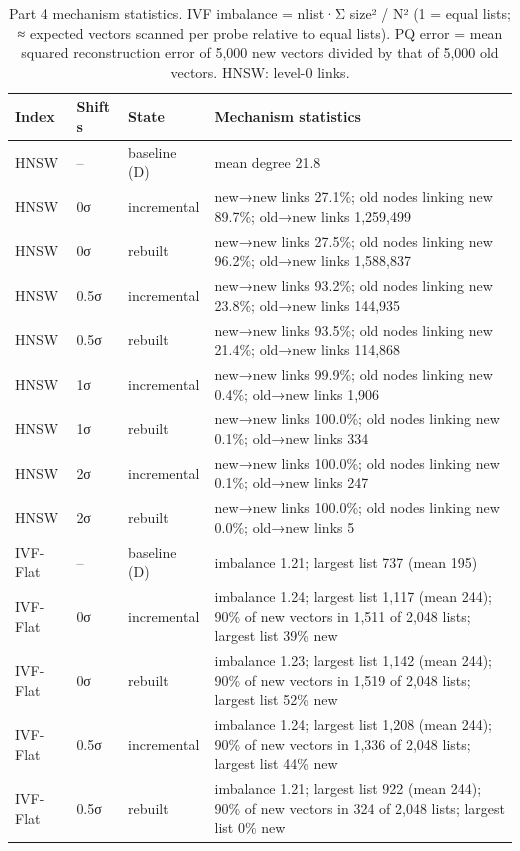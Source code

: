 \begin{table}[t]
\centering
\small
\caption{Part 4 mechanism statistics. IVF imbalance = nlist·Σ size² / N² (1 = equal lists; ≈ expected vectors scanned per probe relative to equal lists). PQ error = mean squared reconstruction error of 5,000 new vectors divided by that of 5,000 old vectors. HNSW: level-0 links.}
\label{tab:t4b_drift_mechanism}
\begin{tabular}{lllp{10cm}}
\toprule
Index & Shift s & State & Mechanism statistics \\
\midrule
HNSW & -- & baseline (D) & mean degree 21.8 \\
HNSW & 0σ & incremental & new→new links 27.1\%; old nodes linking new 89.7\%; old→new links 1,259,499 \\
HNSW & 0σ & rebuilt & new→new links 27.5\%; old nodes linking new 96.2\%; old→new links 1,588,837 \\
HNSW & 0.5σ & incremental & new→new links 93.2\%; old nodes linking new 23.8\%; old→new links 144,935 \\
HNSW & 0.5σ & rebuilt & new→new links 93.5\%; old nodes linking new 21.4\%; old→new links 114,868 \\
HNSW & 1σ & incremental & new→new links 99.9\%; old nodes linking new 0.4\%; old→new links 1,906 \\
HNSW & 1σ & rebuilt & new→new links 100.0\%; old nodes linking new 0.1\%; old→new links 334 \\
HNSW & 2σ & incremental & new→new links 100.0\%; old nodes linking new 0.1\%; old→new links 247 \\
HNSW & 2σ & rebuilt & new→new links 100.0\%; old nodes linking new 0.0\%; old→new links 5 \\
IVF-Flat & -- & baseline (D) & imbalance 1.21; largest list 737 (mean 195) \\
IVF-Flat & 0σ & incremental & imbalance 1.24; largest list 1,117 (mean 244); 90\% of new vectors in 1,511 of 2,048 lists; largest list 39\% new \\
IVF-Flat & 0σ & rebuilt & imbalance 1.23; largest list 1,142 (mean 244); 90\% of new vectors in 1,519 of 2,048 lists; largest list 52\% new \\
IVF-Flat & 0.5σ & incremental & imbalance 1.24; largest list 1,208 (mean 244); 90\% of new vectors in 1,336 of 2,048 lists; largest list 44\% new \\
IVF-Flat & 0.5σ & rebuilt & imbalance 1.21; largest list 922 (mean 244); 90\% of new vectors in 324 of 2,048 lists; largest list 0\% new \\

\end{tabular}
\end{table}

